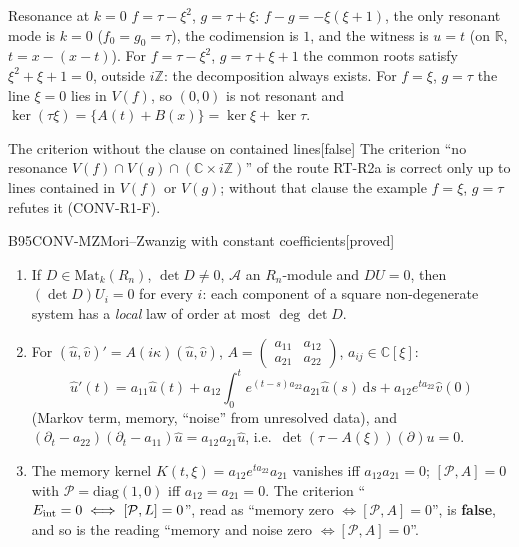\documentclass[11pt,a4paper,oneside]{report}
\newcommand{\badge}[2]{\textcolor{#1}{\textsf{\footnotesize[#2]}}}
\newcommand{\proved}{\badge{cC}{proved}}
\newcommand{\falsest}{\badge{cB}{false}}
\newcommand{\R}{\mathbb{R}}\newcommand{\C}{\mathbb{C}}\newcommand{\N}{\mathbb{N}}\newcommand{\Z}{\mathbb{Z}}\newcommand{\Q}{\mathbb{Q}}
\newcommand{\dd}{\,\mathrm{d}}
\newenvironment{dimcard}[5]{\par\Needspace{12\baselineskip}\begin{dimcardbox}{#1}{#2}{#3}{#4}{#5}}{\end{dimcardbox}}
\begin{document}
\begin{example}{Resonance at $k=0$}
$f=\tau-\xi^2$, $g=\tau+\xi$: $f-g=-\xi(\xi+1)$, the only resonant mode is $k=0$ ($f_0=g_0=\tau$), the codimension is $1$, and the witness is $u=t$ (on $\R$, $t=x-(x-t)$). For $f=\tau-\xi^2$, $g=\tau+\xi+1$ the common roots satisfy $\xi^2+\xi+1=0$, outside $i\Z$: the decomposition always exists. For $f=\xi$, $g=\tau$ the line $\xi=0$ lies in $V(f)$, so $(0,0)$ is not resonant and $\ker(\tau\xi)=\{A(t)+B(x)\}=\ker\xi+\ker\tau$.
\end{example}

\begin{falsebox}{The criterion without the clause on contained lines}{\falsest}
The criterion ``no resonance $V(f)\cap V(g)\cap(\C\times i\Z)$'' of the route RT-R2a is correct only up to lines contained in $V(f)$ or $V(g)$; without that clause the example $f=\xi$, $g=\tau$ refutes it (CONV-R1-F).
\end{falsebox}

\begin{dimcard}{B95}{CONV-MZ}{Mori--Zwanzig with constant coefficients}{\proved}{}
\begin{enumerate}[label=(MZ\arabic*)]
\item If $D\in\mathrm{Mat}_k(R_n)$, $\det D\ne0$, $\mathcal A$ an $R_n$-module and $DU=0$, then $(\det D)U_i=0$ for every $i$: each component of a square non-degenerate system has a \emph{local} law of order at most $\deg\det D$.
\item For $(\hat u,\hat v)'=A(i\kappa)(\hat u,\hat v)$, $A=\begin{pmatrix}a_{11}&a_{12}\\a_{21}&a_{22}\end{pmatrix}$, $a_{ij}\in\C[\xi]$:
\[
\hat u'(t)=a_{11}\hat u(t)+a_{12}\!\int_0^t\!e^{(t-s)a_{22}}a_{21}\hat u(s)\dd s+a_{12}e^{ta_{22}}\hat v(0)
\]
(Markov term, memory, ``noise'' from unresolved data), and $(\partial_t-a_{22})(\partial_t-a_{11})\hat u=a_{12}a_{21}\hat u$, i.e.\ $\det(\tau-A(\xi))(\partial)u=0$.
\item The memory kernel $K(t,\xi)=a_{12}e^{ta_{22}}a_{21}$ vanishes iff $a_{12}a_{21}=0$; $[\mathcal P,A]=0$ with $\mathcal P=\mathrm{diag}(1,0)$ iff $a_{12}=a_{21}=0$. The criterion ``$E_{\rm int}=0\iff[\mathcal P,L]=0$'', read as ``memory zero $\iff[\mathcal P,A]=0$'', is \textbf{false}, and so is the reading ``memory and noise zero $\iff[\mathcal P,A]=0$''.
\end{enumerate}
\end{dimcard}
\end{document}
